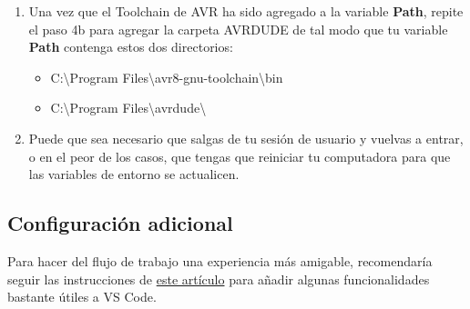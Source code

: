 \documentclass[10pt,letterpaper]{article}
\begin{document}
\begin{enumerate}
\begin{enumerate}
\begin{enumerate}
        \end{enumerate}
    \end{enumerate}
    \item Una vez que el Toolchain de AVR ha sido agregado a la variable \textbf{Path}, repite el paso 4b para agregar la carpeta AVRDUDE de tal modo que tu variable \textbf{Path} contenga estos dos directorios:
    \begin{itemize}
        \item {\color{ForestGreen}C:\textbackslash Program Files\textbackslash avr8-gnu-toolchain\textbackslash bin}
        \item {\color{ForestGreen}C:\textbackslash Program Files\textbackslash avrdude\textbackslash}
    \end{itemize}
    \item Puede que sea necesario que salgas de tu sesión de usuario y vuelvas a entrar, o en el peor de los casos, que tengas que reiniciar tu computadora para que las variables de entorno se actualicen. 
\end{enumerate}

\subsection{Configuración adicional}
Para hacer del flujo de trabajo una experiencia más amigable, recomendaría seguir las instrucciones de \href{https://www.tonymitchell.ca/posts/use-vscode-with-avr-toolchain/}{este artículo} para añadir algunas funcionalidades bastante útiles a VS Code.
\end{document}

